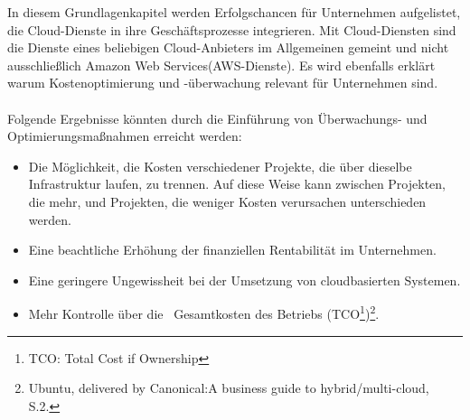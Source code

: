 In diesem Grundlagenkapitel werden Erfolgschancen für Unternehmen aufgelistet, die Cloud-Dienste in ihre Geschäftsprozesse integrieren. Mit Cloud-Diensten sind die Dienste eines beliebigen Cloud-Anbieters im Allgemeinen gemeint und nicht ausschließlich Amazon Web Services(AWS-Dienste). 
Es wird ebenfalls erklärt warum Kostenoptimierung und -überwachung relevant für Unternehmen sind.
\\\\
Folgende Ergebnisse könnten durch die Einführung von Überwachungs- und Optimierungsmaßnahmen erreicht werden:
\begin{itemize}
      \item
            Die Möglichkeit, die Kosten verschiedener Projekte, die über dieselbe Infrastruktur laufen, zu trennen.
            Auf diese Weise kann zwischen Projekten, die mehr, und Projekten, die weniger Kosten verursachen unterschieden werden.%
      \item
            Eine beachtliche Erhöhung der finanziellen Rentabilität im Unternehmen.%
      \item
            Eine geringere Ungewissheit bei der Umsetzung von cloudbasierten Systemen.
      \item
            Mehr Kontrolle über die  Gesamtkosten des Betriebs (TCO\footnote{TCO: Total Cost if Ownership})\footnote{Ubuntu, delivered by Canonical:A business guide to hybrid/multi-cloud, S.2.\cite{CAN01}}.

\end{itemize}




